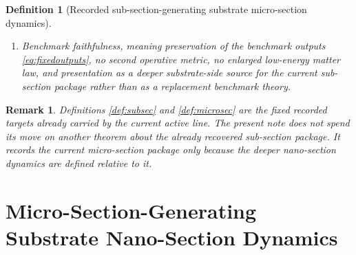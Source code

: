 \documentclass[11pt]{article}
\newcommand{\SubSectionShell}[1]{\mathcal Z_{#1}^{\mathrm{subsec}}}
\newcommand{\MicroSectionProj}[1]{\Pi_{#1}^{\mathrm{microsec}}}
\newcommand{\MicroSectionFiber}[2]{\mathcal F_{#1}^{\mathrm{microsec}}(#2)}
\newcommand{\MicroSectionFunctional}[1]{\mathscr E_{#1}^{\mathrm{microsec}}}
\newcommand{\MicroSectionShell}[1]{\mathcal Z_{#1}^{\mathrm{microsec}}}
\newtheorem{definition}{Definition}
\newtheorem{remark}{Remark}
\begin{document}
\begin{definition}[Recorded sub-section-generating substrate micro-section dynamics]
\begin{enumerate}
\[\begin{array}{l}
    \MicroSectionFunctional{\sigma}(u)
    =
    \displaystyle\min_{v\in\MicroSectionFiber{\sigma}{\MicroSectionProj{\sigma}(u)}}
    \MicroSectionFunctional{\sigma}(v)
    \end{array}
    \right\},
    \]
    and
    \[
    \MicroSectionProj{\sigma}\big|_{\MicroSectionShell{\sigma}}
    :
    \MicroSectionShell{\sigma}
    \xrightarrow{\cong}
    \SubSectionShell{\sigma}
    \]
    is a diffeomorphism.
    \item Benchmark faithfulness, meaning preservation of the benchmark outputs \eqref{eq:fixedoutputs}, no second operative metric, no enlarged low-energy matter law, and presentation as a deeper substrate-side source for the current sub-section package rather than as a replacement benchmark theory.
\end{enumerate}
\end{definition}

\begin{remark}
Definitions \ref{def:subsec} and \ref{def:microsec} are the fixed recorded targets already carried by the current active line. The present note does not spend its move on another theorem about the already recovered sub-section package. It records the current micro-section package only because the deeper nano-section dynamics are defined relative to it.
\end{remark}

\section{Micro-Section-Generating Substrate Nano-Section Dynamics}
\end{document}
